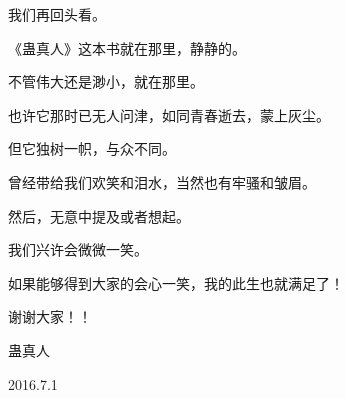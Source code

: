 \begin{this_body}
我们再回头看。

《蛊真人》这本书就在那里，静静的。

不管伟大还是渺小，就在那里。

也许它那时已无人问津，如同青春逝去，蒙上灰尘。

但它独树一帜，与众不同。

曾经带给我们欢笑和泪水，当然也有牢骚和皱眉。

然后，无意中提及或者想起。

我们兴许会微微一笑。

如果能够得到大家的会心一笑，我的此生也就满足了！

谢谢大家！！

蛊真人

2016.7.1

\end{this_body}

